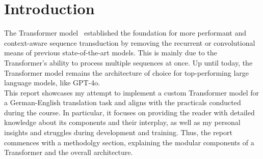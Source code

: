 \section{Introduction}

The Transformer model~\cite{vaswani2017attention} established the foundation for more performant and context-aware sequence transduction by removing the recurrent or convolutional means of previous state-of-the-art models.
This is mainly due to the Transformer's ability to process multiple sequences at once.
Up until today, the Transformer model remains the architecture of choice for top-performing large language models, like GPT-4o. \\
This report showcases my attempt to implement a custom Transformer model for a German-English translation task and aligns with the practicals conducted during the course.
In particular, it focuses on providing the reader with detailed knowledge about its components and their interplay, as well as my personal insights and struggles during development and training.
Thus, the report commences with a methodolgy section, explaining the modular components of a Transformer and the overall architecture.

